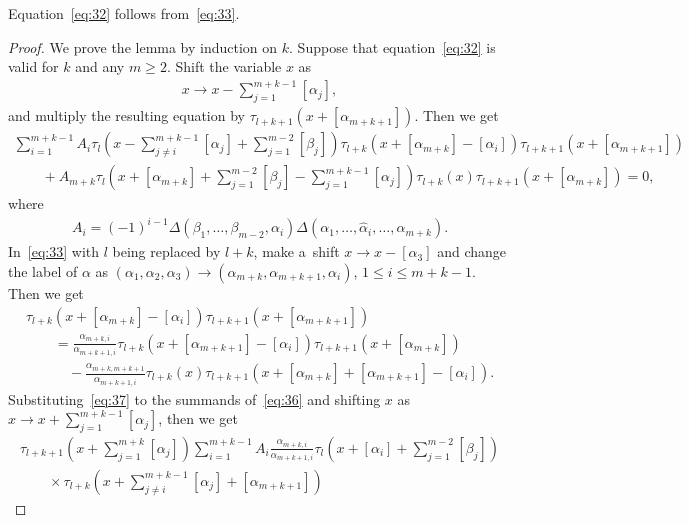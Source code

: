 \documentclass[pdftex]{sigma}
\begin{document}
\begin{lemma}\label{lemma1}
Equation~\eqref{eq:32} follows from~\eqref{eq:33}.
\end{lemma}
\begin{proof}
We prove the lemma by induction on $k$.
Suppose that equation~\eqref{eq:32} is valid for $k$ and any $m\ge2$.
Shift the variable $x$ as
\begin{gather*}
x\rightarrow x-\sum_{j=1}^{m+k-1}[\alpha_j],
\end{gather*}
and multiply the resulting equation by $\tau_{l+k+1}(x+[\alpha_{m+k+1}])$.
Then we get
\begin{gather}
\sum_{i=1}^{m+k-1}A_i\tau_l\left(x-\sum_{j\neq i}^{m+k-1}[\alpha_j]+\sum_{j=1}^{m-2}[\beta_j]\right)\tau_{l+k}
\left(x+[\alpha_{m+k}]-[\alpha_i]\right)\tau_{l+k+1}(x+[\alpha_{m+k+1}])\nonumber
\\
\qquad
{}+A_{m+k}\tau_l\left(x+[\alpha_{m+k}]+\sum_{j=1}^{m-2}[\beta_j]-\sum_{j=1}^{m+k-1}[\alpha_j]\right)\tau_{l+k}
(x)\tau_{l+k+1}(x+[\alpha_{m+k}])=0,
\label{eq:36}
\end{gather}
where
\begin{gather*}
A_i=(-1)^{i-1}\Delta(\beta_1,\dots,\beta_{m-2},\alpha_i)\Delta(\alpha_1,\dots,\hat{\alpha}
_i,\dots,\alpha_{m+k}).
\end{gather*}
In~\eqref{eq:33} with $l$ being replaced by $l+k$, make a~shift $x\rightarrow x-[\alpha_3]$ and change the
label of $\alpha$ as $(\alpha_1,\alpha_2,\alpha_3)\rightarrow(\alpha_{m+k},\alpha_{m+k+1},\alpha_i)$, $1\le
i\le m+k-1$.
Then we get
\begin{gather}
\tau_{l+k}(x+[\alpha_{m+k}]-[\alpha_i])\tau_{l+k+1}(x+[\alpha_{m+k+1}])\nonumber
\\
\qquad
{}=\frac{\alpha_{m+k,i}}{\alpha_{m+k+1,i}}\tau_{l+k}(x+[\alpha_{m+k+1}]-[\alpha_i])\tau_{l+k+1}
(x+[\alpha_{m+k}])\nonumber
\\
\qquad\quad{}
-\frac{\alpha_{m+k,m+k+1}}{\alpha_{m+k+1,i}}\tau_{l+k}(x)\tau_{l+k+1}(x+[\alpha_{m+k}]+[\alpha_{m+k+1}
]-[\alpha_i]).
\label{eq:37}
\end{gather}
Substituting~\eqref{eq:37} to the summands of~\eqref{eq:36} and shifting $x$ as $x\rightarrow
x+\sum\limits_{j=1}^{m+k-1}[\alpha_j]$, then we get
\begin{gather}
\tau_{l+k+1}\left(x+\sum_{j=1}^{m+k}[\alpha_j]\right)
\sum_{i=1}^{m+k-1}A_i\frac{\alpha_{m+k,i}}{\alpha_{m+k+1,i}}
\tau_l\left(x+[\alpha_i]+\sum_{j=1}^{m-2}[\beta_j]\right)
\nonumber
\\
\qquad
{}\times\tau_{l+k}
\left(x+ \sum_{j\neq i}^{m+k-1}[\alpha_j]+[\alpha_{m+k+1}]\right)

\end{gather}
\end{proof}
\end{document}
